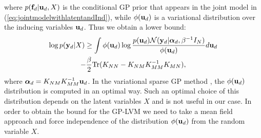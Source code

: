 \documentclass[twoside,times]{article}
\begin{document}
where $p(\mathbf{f}_d|\mathbf{u}_d,X)$ is the conditional GP prior that 
appears in the joint model in
(\ref{eq:jointmodelwithlatentandInd}), while $\phi(\mathbf{u}_d)$ is a
variational distribution over the inducing variables $\mathbf{u}_d$. 
Thus we obtain a lower bound: 
\begin{multline}
\log p(\mathbf{y}_d | X) 
\geq  \int \phi(\mathbf{u}_d) 
\log \frac{ p(\mathbf{u}_d) \mathcal{N}(\mathbf{y}_d| \boldsymbol{\alpha}_d,
\beta^{-1} I_N) }{\phi(\mathbf{u}_d)} d \mathbf{u}_d \\
- \frac{\beta}{2} 
\text{Tr} (K_{NN} - K_{NM} K_{MM}^{-1} K_{MN}), 
\label{eq:lowerboundofF1}
\end{multline} 
where $\boldsymbol{\alpha}_d =  K_{NM} K_{MM}^{-1} \mathbf{u}_d$. 
In the variational sparse GP method \citep{Titsias:variational09}, 
the $\phi(\mathbf{u}_d)$ distribution is computed in an optimal way. 
Such an optimal choice of this distribution depends on
the latent variables $X$ and is not useful in our case. In order 
to obtain the bound for the GP-LVM we need to take a mean field
approach and force independence of the
distribution  
$\phi(\mathbf{u}_d)$ from the random variable $X$. 


\end{document}
